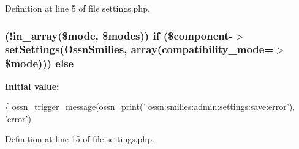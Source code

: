 Definition at line 5 of file settings.\+php.

\subsubsection[{\texorpdfstring{else}{else}}]{ (!in\+\_\+array(\$mode, \$modes)) {\bf if} (\$component-\/$>$set\+Settings(\textquotesingle{}Ossn\+Smilies\textquotesingle{}, array(\textquotesingle{}compatibility\+\_\+mode\textquotesingle{}=$>$ \$mode))) else}\hypertarget{components_2_ossn_smilies_2actions_2smilies_2admin_2settings_8php_a22fafe652c6ed1f2ecfc5a3e98feff4d}{}\label{components_2_ossn_smilies_2actions_2smilies_2admin_2settings_8php_a22fafe652c6ed1f2ecfc5a3e98feff4d}
{\bfseries Initial value\+:}
\begin{DoxyCode}
\{
        \hyperlink{ossn_8lib_8system_8php_ab3f23f23f32f50c12e7aea0ffaccaac7}{ossn\_trigger\_message}(\hyperlink{ossn_8lib_8languages_8php_a2be5d1c4b695593a9b9067b96df2150a}{ossn\_print}(\textcolor{stringliteral}{'
      ossn:smilies:admin:settings:save:error'}), \textcolor{stringliteral}{'error'})
\end{DoxyCode}


Definition at line 15 of file settings.\+php.

